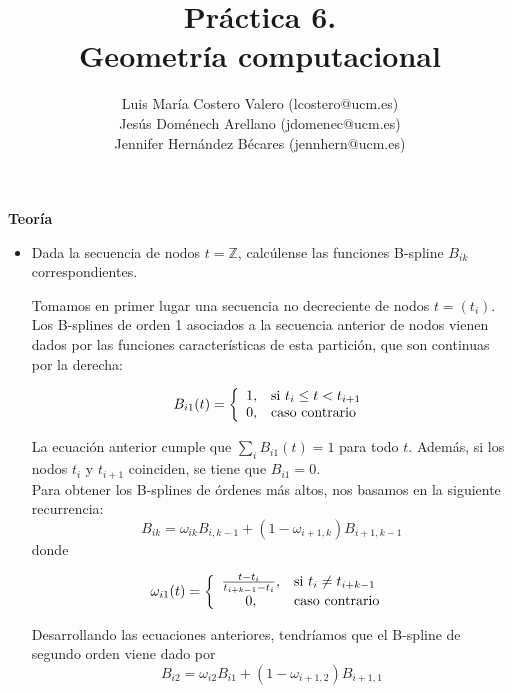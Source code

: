 \documentclass[12pt,a4paper]{article}
\title{Práctica 6. \\ Geometría computacional}
\author{Luis María Costero Valero (lcostero@ucm.es)\\ Jesús Doménech
  Arellano (jdomenec@ucm.es) \\ Jennifer Hernández Bécares (jennhern@ucm.es)}
\date{}
\begin{document}
\maketitle
\onehalfspace

\begin{center}
  {\large \textbf{Teoría}}
\end{center}
\begin{itemize}
\item Dada la secuencia de nodos $t=\mathbb{Z}$, calcúlense las
  funciones B-spline $B_{ik}$ correspondientes.

  Tomamos en primer lugar una secuencia no decreciente de nodos
  $t=(t_i)$. Los B-splines de orden 1 asociados a la secuencia
  anterior de nodos vienen dados por las funciones características de
  esta partición, que son continuas por la derecha:
  
  \begin{equation}
    B_{i1}(t)=
    \left\lbrace
    \begin{array}{c l}
      1, & $si $t_i\le t<t_{i+1}\\
      0, & $caso contrario $ \\
    \end{array}
    \right.
  \end{equation}

  La ecuación anterior cumple que $\sum_{i}B_{i1}(t)=1$ para todo $t$. Además, si los nodos $t_i$ y $t_{i+1}$ coinciden, se tiene que $B_{i1}=0$. \\

  Para obtener los B-splines de órdenes más altos, nos basamos en la siguiente recurrencia:
  \begin{equation}
    B_{ik}=\omega_{ik}B_{i,k-1}+(1-\omega_{i+1,k})B_{i+1,k-1}
  \end{equation}
  donde
      
  \begin{equation}
    \omega_{i1}(t)=
    \left\lbrace
    \begin{array}{c l}
      \frac{t-t_i}{t_{i+k-1}-t_i}, & $si $t_i\neq t_{i+k-1}\\
      0, & $caso contrario $ \\
    \end{array}
    \right.
  \end{equation}

  Desarrollando las ecuaciones anteriores, tendríamos que el B-spline
  de segundo orden viene dado por
  \begin{equation}
    B_{i2}=\omega_{i2}B_{i1}+(1-\omega_{i+1,2})B_{i+1,1}
  \end{equation}


\end{itemize}
\end{document}
